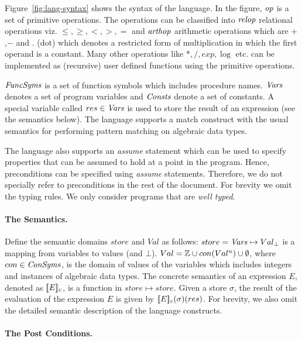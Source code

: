 Figure~\ref{fig:lang-syntax} shows the syntax of the language.
In the figure, $\mathit{op}$ is a set of primitive operations.
The operations can be classified into $\mathit{relop}$ relational operations viz. $\le,\ge,<,>,=$
and $\mathit{arthop}$ arithmetic operations which are $+$,$-$ and $.$ (dot) which denotes a restricted
form of multiplication in which the first operand is a constant.
Many other operations like $*,/,exp,\log$ etc. can be implemented as (recursive) user defined functions
using the primitive operations.

$\mathit{FuncSyms}$ is a set of function symbols which includes procedure names.
$\mathit{Vars}$ denotes a set of program variables and $\mathit{Consts}$ denote a set of constants.
A special variable called $res \in \mathit{Vars}$ is used to store the result of an expression (see
the semantics below).
The language supports a match construct with the usual semantics for performing pattern matching
on algebraic data types.

The language also supports an \textit{assume} statement which can be used to specify properties
that can be assumed to hold at a point in the program. 
Hence, preconditions can be specified using \textit{assume} statements. Therefore, we do not specially refer to
preconditions in the rest of the document.
For brevity we omit the typing rules. We only consider programs that are \emph{well typed}.

\paragraph{The Semantics.}

Define the semantic domains $store$ and $Val$ as follows: 
$store = \mathit{Vars} \mapsto Val_{\bot}$ is a mapping from variables to values (and $\bot$).
$Val = \mathbb{Z} \cup con(Val^n) \cup \emptyset$, where $con \in \mathit{ConSyms}$, is the domain of values of 
the variables which includes integers and instances of algebraic data types.
The concrete semantics of an expression $E$, denoted as $[\![E]\!]_c$, is a function in
$store \mapsto store$. Given a store $\sigma$, the result of the evaluation
of the expression $E$ is given by $[\![E]\!]_c(\sigma)(res)$.
For brevity, we also omit the detailed semantic description of the language constructs.

\paragraph{The Post Conditions.}

